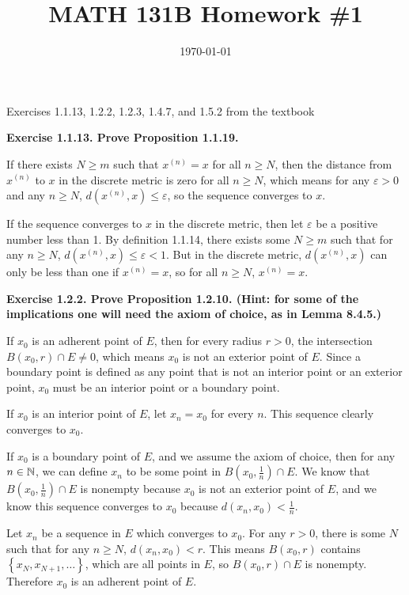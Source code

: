 \documentclass{article}
\date{\today}
\title{MATH 131B Homework \#1}
\begin{document}
\maketitle

\begin{prob}
    Exercises 1.1.13, 1.2.2, 1.2.3, 1.4.7, and 1.5.2 from the textbook
\end{prob}
\textbf{Exercise 1.1.13. Prove Proposition 1.1.19.}
\par
If there exists $N \geq m$ such that $x^{(n)}=x$ for all $n \geq N$, then the distance from $x^{(n)}$ to $x$ in the discrete metric is zero for all $n \geq N$, which means for any $\varepsilon > 0$ and any $n \geq N$, $d(x^{(n)}, x) \leq \varepsilon$, so the sequence converges to $x$.
\par
If the sequence converges to $x$ in the discrete metric, then let $\varepsilon$ be a positive number less than 1. By definition 1.1.14, there exists some $N \geq m$ such that for any $n \geq N$, $d(x^{(n)}, x) \leq \varepsilon < 1$. But in the discrete metric, $d(x^{(n)},x)$ can only be less than one if $x^{(n)}=x$, so for all $n \geq N$, $x^{(n)}=x$.
\bigskip
\par
\textbf{Exercise 1.2.2. Prove Proposition 1.2.10. (Hint: for some of the implications one will need the axiom of choice, as in Lemma 8.4.5.)}
\par
{} If $x_0$ is an adherent point of $E$, then for every radius $r > 0$, the intersection $B(x_0, r) \cap E \neq 0$, which means $x_0$ is not an exterior point of $E$. Since a boundary point is defined as any point that is not an interior point or an exterior point, $x_0$ must be an interior point or a boundary point.
\par
{} If $x_0$ is an interior point of $E$, let $x_n=x_0$ for every $n$. This sequence clearly converges to $x_0$.
\par
If $x_0$ is a boundary point of $E$, and we assume the axiom of choice, then for any $n \in \mathbb{N}$, we can define $x_n$ to be some point in $B(x_0, \frac{1}{n}) \cap E$. We know that $B(x_0, \frac{1}{n}) \cap E$ is nonempty because $x_0$ is not an exterior point of $E$, and we know this sequence converges to $x_0$ because $d(x_n, x_0) < \frac{1}{n}$.
\par
{} Let $x_n$ be a sequence in $E$ which converges to $x_0$. For any $r > 0$, there is some $N$ such that for any $n \geq N$, $d(x_n, x_0) < r$. This means $B(x_0, r)$ contains $\left\{ x_N, x_{N+1}, \dots \right\}$, which are all points in $E$, so $B(x_0, r) \cap E$ is nonempty. Therefore $x_0$ is an adherent point of $E$.
\end{document}
